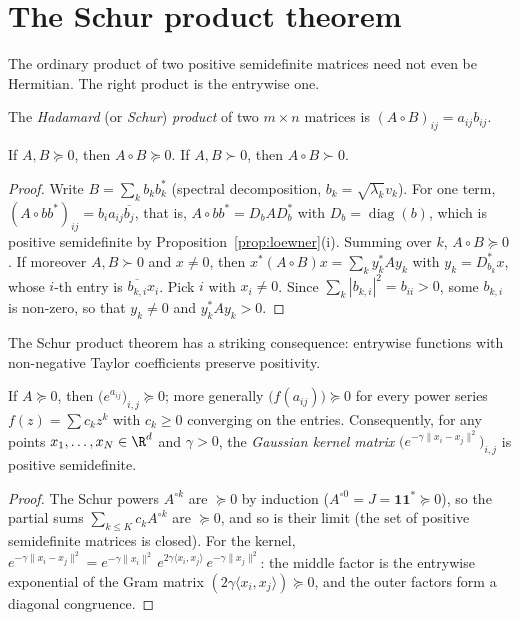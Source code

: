 \section{The Schur product theorem}

The ordinary product of two positive semidefinite matrices need not even be Hermitian. The right product is the entrywise one.

\begin{definition}\label{def:hadamardproduct}
The \emph{Hadamard} (or \emph{Schur}) \emph{product} of two $m\times n$ matrices is $(A\circ B)_{ij}=a_{ij}b_{ij}$.
\end{definition}

\begin{theorem}[Schur, 1911]\label{thm:schurproduct}
If $A,B\succeq0$, then $A\circ B\succeq0$. If $A,B\succ0$, then $A\circ B\succ0$.
\end{theorem}
\begin{proof}
Write $B=\sum_kb_kb_k^*$ (spectral decomposition, $b_k=\sqrt{\lambda_k}v_k$). For one term, $(A\circ b b^*)_{ij}=b_ia_{ij}\overline{b_j}$, that
is, $A\circ bb^*=D_bAD_b^*$ with $D_b=\operatorname{diag}(b)$, which is positive semidefinite by Proposition~\ref{prop:loewner}(i).
Summing over $k$, $A\circ B\succeq0$. If moreover $A,B\succ0$ and $x\ne0$, then $x^*(A\circ B)x=\sum_ky_k^*Ay_k$ with $y_k=D_{b_k}^*x$, whose
$i$-th entry is $\overline{b_{k,i}}x_i$. Pick $i$ with $x_i\ne0$. Since $\sum_k|b_{k,i}|^2=b_{ii}>0$, some $b_{k,i}$ is non-zero, so that
$y_k\ne0$ and $y_k^*Ay_k>0$.
\end{proof}

The Schur product theorem has a striking consequence: entrywise functions with non-negative Taylor coefficients preserve positivity.

\begin{corollary}\label{cor:entrywiseexp}
If $A\succeq0$, then $\bigl(e^{a_{ij}}\bigr)_{i,j}\succeq0$; more generally $\bigl(f(a_{ij})\bigr)\succeq0$ for every power series $f(z)=\sum c_kz^k$
with $c_k\ge0$ converging on the entries. Consequently, for any points $x_1,\dots,x_N\in\R^d$ and $\gamma>0$, the \emph{Gaussian kernel
matrix} $\bigl(e^{-\gamma\|x_i-x_j\|^2}\bigr)_{i,j}$ is positive semidefinite.
\end{corollary}
\begin{proof}
The Schur powers $A^{\circ k}$ are $\succeq0$ by induction ($A^{\circ0}=J=\mathbf 1\mathbf 1^*\succeq0$), so the partial sums
$\sum_{k\le K}c_kA^{\circ k}$ are $\succeq0$, and so is their limit (the set of positive semidefinite matrices is closed). For the kernel,
$e^{-\gamma\|x_i-x_j\|^2}=e^{-\gamma\|x_i\|^2}\,e^{2\gamma\langle x_i,x_j\rangle}\,e^{-\gamma\|x_j\|^2}$: the middle factor is the entrywise
exponential of the Gram matrix $(2\gamma\langle x_i,x_j\rangle)\succeq0$, and the outer factors form a diagonal congruence.
\end{proof}

